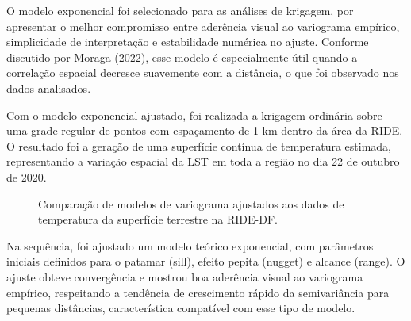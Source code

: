 \documentclass[
  letterpaper,
  DIV=11,
  numbers=noendperiod]{scrartcl}
\begin{document}
O modelo exponencial foi selecionado para as análises de krigagem, por
apresentar o melhor compromisso entre aderência visual ao variograma
empírico, simplicidade de interpretação e estabilidade numérica no
ajuste. Conforme discutido por Moraga (2022), esse modelo é
especialmente útil quando a correlação espacial decresce suavemente com
a distância, o que foi observado nos dados analisados.

Com o modelo exponencial ajustado, foi realizada a krigagem ordinária
sobre uma grade regular de pontos com espaçamento de 1 km dentro da área
da RIDE. O resultado foi a geração de uma superfície contínua de
temperatura estimada, representando a variação espacial da LST em toda a
região no dia 22 de outubro de 2020.

\label{cell-fig-ajuste-variogramas}
\begin{figure}[H]


\caption{\label{fig-ajuste-variogramas}Comparação de modelos de
variograma ajustados aos dados de temperatura da superfície terrestre na
RIDE-DF.}

\end{figure}%

Na sequência, foi ajustado um modelo teórico exponencial, com parâmetros
iniciais definidos para o patamar (sill), efeito pepita (nugget) e
alcance (range). O ajuste obteve convergência e mostrou boa aderência
visual ao variograma empírico, respeitando a tendência de crescimento
rápido da semivariância para pequenas distâncias, característica
compatível com esse tipo de modelo.
\end{document}
